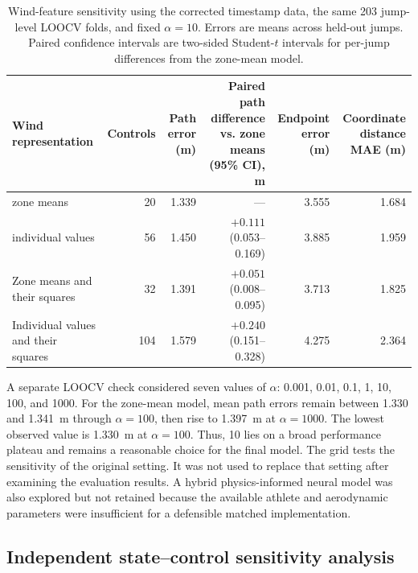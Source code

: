 \documentclass[11pt,twoside,a4paper]{article}
\begin{document}
\begin{table}[t]
\centering
\small
\begin{tabularx}{\textwidth}{@{}>{\raggedright\arraybackslash}Xrrrrr@{}}
\toprule
Wind representation & Controls & \shortstack{Path error\\(m)} & \shortstack{Paired path difference\\vs. zone means (95\% CI), m} & \shortstack{Endpoint error\\(m)} & \shortstack{Coordinate distance\\MAE (m)} \\
\midrule
12 zone means & 20 & 1.339 & --- & 3.555 & 1.684 \\
48 individual values & 56 & 1.450 & $+0.111$ (0.053--0.169) & 3.885 & 1.959 \\
Zone means and their squares & 32 & 1.391 & $+0.051$ (0.008--0.095) & 3.713 & 1.825 \\
Individual values and their squares & 104 & 1.579 & $+0.240$ (0.151--0.328) & 4.275 & 2.364 \\
\bottomrule
\end{tabularx}
\caption{Wind-feature sensitivity using the corrected timestamp data, the same 203 jump-level LOOCV folds, and fixed $\alpha=10$. Errors are means across held-out jumps. Paired confidence intervals are two-sided Student-$t$ intervals for per-jump differences from the zone-mean model.}
\label{tab:windfeatures}
\end{table}

A separate LOOCV check considered seven values of $\alpha$: 0.001, 0.01, 0.1, 1, 10, 100, and 1000. For the zone-mean model, mean path errors remain between 1.330 and 1.341~m through $\alpha=100$, then rise to 1.397~m at $\alpha=1000$. The lowest observed value is 1.330~m at $\alpha=100$. Thus, 10 lies on a broad performance plateau and remains a reasonable choice for the final model. The grid tests the sensitivity of the original setting. It was not used to replace that setting after examining the evaluation results. A hybrid physics-informed neural model \cite{raissi2019physics,Cai2021_PINN_FluidMechanics} was also explored but not retained because the available athlete and aerodynamic parameters were insufficient for a defensible matched implementation.

\subsection{Independent state--control sensitivity analysis}
\end{document}
